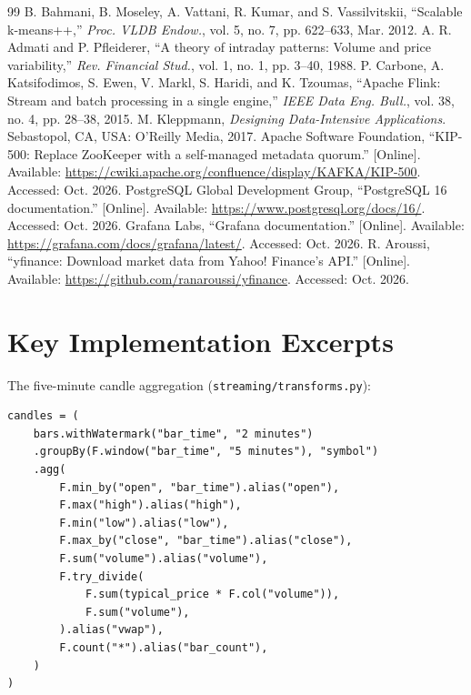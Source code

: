 \documentclass[conference]{IEEEtran}
\newcommand{\code}[1]{\texttt{#1}}
\begin{document}
\begin{thebibliography}{99}
 B. Bahmani, B. Moseley, A. Vattani, R. Kumar, and S. Vassilvitskii, ``Scalable k-means++,'' \emph{Proc. VLDB Endow.}, vol. 5, no. 7, pp. 622--633, Mar. 2012.
 A. R. Admati and P. Pfleiderer, ``A theory of intraday patterns: Volume and price variability,'' \emph{Rev. Financial Stud.}, vol. 1, no. 1, pp. 3--40, 1988.
 P. Carbone, A. Katsifodimos, S. Ewen, V. Markl, S. Haridi, and K. Tzoumas, ``Apache Flink: Stream and batch processing in a single engine,'' \emph{IEEE Data Eng. Bull.}, vol. 38, no. 4, pp. 28--38, 2015.
 M. Kleppmann, \emph{Designing Data-Intensive Applications}. Sebastopol, CA, USA: O'Reilly Media, 2017.
 Apache Software Foundation, ``KIP-500: Replace ZooKeeper with a self-managed metadata quorum.'' [Online]. Available: \url{https://cwiki.apache.org/confluence/display/KAFKA/KIP-500}. Accessed: Oct. 2026.
 PostgreSQL Global Development Group, ``PostgreSQL 16 documentation.'' [Online]. Available: \url{https://www.postgresql.org/docs/16/}. Accessed: Oct. 2026.
 Grafana Labs, ``Grafana documentation.'' [Online]. Available: \url{https://grafana.com/docs/grafana/latest/}. Accessed: Oct. 2026.
 R. Aroussi, ``yfinance: Download market data from Yahoo! Finance's API.'' [Online]. Available: \url{https://github.com/ranaroussi/yfinance}. Accessed: Oct. 2026.
\end{thebibliography}

\appendices

\section{Key Implementation Excerpts}

The five-minute candle aggregation (\code{streaming/transforms.py}):
\begin{lstlisting}
candles = (
    bars.withWatermark("bar_time", "2 minutes")
    .groupBy(F.window("bar_time", "5 minutes"), "symbol")
    .agg(
        F.min_by("open", "bar_time").alias("open"),
        F.max("high").alias("high"),
        F.min("low").alias("low"),
        F.max_by("close", "bar_time").alias("close"),
        F.sum("volume").alias("volume"),
        F.try_divide(
            F.sum(typical_price * F.col("volume")),
            F.sum("volume"),
        ).alias("vwap"),
        F.count("*").alias("bar_count"),
    )
)
\end{lstlisting}
\end{document}
